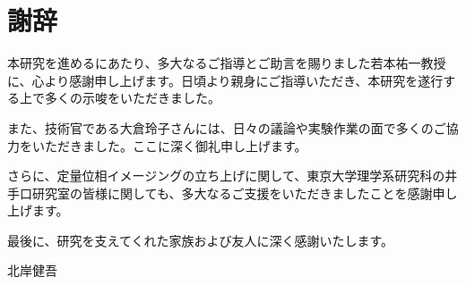 \chapter*{謝辞}
本研究を進めるにあたり、多大なるご指導とご助言を賜りました若本祐一教授に、心より感謝申し上げます。日頃より親身にご指導いただき、本研究を遂行する上で多くの示唆をいただきました。

また、技術官である大倉玲子さんには、日々の議論や実験作業の面で多くのご協力をいただきました。ここに深く御礼申し上げます。

さらに、定量位相イメージングの立ち上げに関して、東京大学理学系研究科の井手口研究室の皆様に関しても、多大なるご支援をいただきましたことを感謝申し上げます。

最後に、研究を支えてくれた家族および友人に深く感謝いたします。
\begin{flushright}
	 北岸健吾
\end{flushright}
